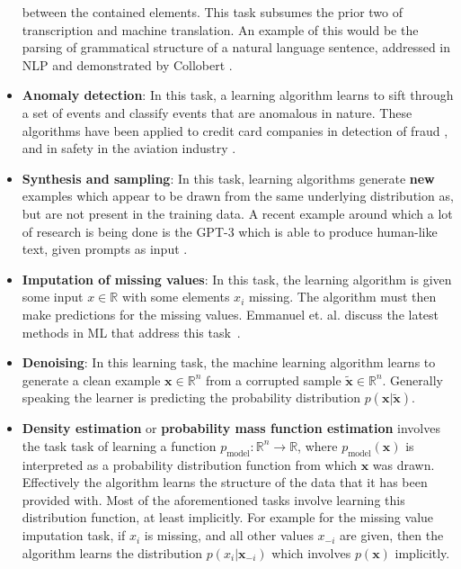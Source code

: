 \begin{itemize}
    between the contained elements. This task subsumes the prior two of
    transcription and machine translation. An example of this would be the
    parsing of grammatical structure of a natural language sentence,
    addressed in \gls{NLP} and demonstrated by Collobert
    \cite{pmlr-v15-collobert11a}.
    \item \textbf{Anomaly detection}: In this task, a learning algorithm learns
    to sift through a set of events and classify events that are anomalous
    in nature. These algorithms have been applied to credit card companies
    in detection of fraud \cite{DBLP:journals/corr/abs-2108-10005}, and in
    safety in the aviation industry \cite{Janakiraman2016, Basora2019}.
    \item \textbf{Synthesis and sampling}: In this task, learning algorithms
    generate \textbf{new} examples which appear to be drawn from the same
    underlying distribution as, but are not present in the training data.
    A recent example around which a lot of research is being done is the
    \gls{GPT-3} which is able to produce human-like text, given prompts as
    input \cite{DBLP:journals/corr/abs-2005-14165}.
    \item \textbf{Imputation of missing values}: In this task, the learning
    algorithm is given some input $x\in\mathbb{R}$ with some elements
    $x_i$ missing. The algorithm must then make predictions for the
    missing values. Emmanuel et. al. discuss the latest methods in
    \gls{ML} that address this task~\cite{Emmanuel2021}.
    \item \textbf{Denoising}: In this learning task, the machine learning
    algorithm learns to generate a clean example $\mathbf{x}\in\mathbb{R}^n$
    from a corrupted sample $\tilde{\mathbf{x}}\in\mathbb{R}^n$. Generally
    speaking the learner is predicting the probability distribution
    $p(\mathbf{x}|\tilde{\mathbf{x}})$.
    \item \textbf{Density estimation} or \textbf{probability mass function estimation}
    involves the task task of learning a function $p_\text{model}:\mathbb{R}^n\rightarrow{}\mathbb{R}$,
    where $p_\text{model}(\mathbf{x})$ is interpreted as a probability distribution function
    from which $\mathbf{x}$ was drawn. Effectively the algorithm learns the
    structure of the data that it has been provided with. Most of the
    aforementioned tasks involve learning this distribution function, at least
    implicitly. For example for the missing value imputation task, if $x_i$ is
    missing, and all other values $x_{-i}$ are given, then the algorithm learns
    the distribution $p(x_i|\mathbf{x}_{-i})$ which involves $p(\mathbf{x})$
    implicitly.
\end{itemize}
